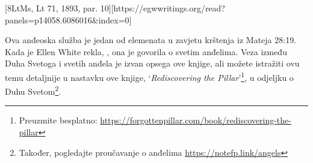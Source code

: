 [8LtMs, Lt 71, 1893, par. 10][https://egwwritings.org/read?panels=p14058.6086016&index=0]

Ova anđeoska služba je jedan od elemenata u zavjetu krštenja iz Mateja 28:19. Kada je Ellen White rekla, , ona je govorila o svetim anđelima. Veza između Duha Svetoga i svetih anđela je izvan opsega ove knjige, ali možete istražiti ovu temu detaljnije u nastavku ove knjige, ‘\textit{Rediscovering the Pillar}’\footnote{Preuzmite besplatno: \href{https://forgottenpillar.com/book/rediscovering-the-pillar}{https://forgottenpillar.com/book/rediscovering-the-pillar}}, u odjeljku o Duhu Svetom\footnote{Također, pogledajte proučavanje o anđelima \href{https://notefp.link/angels}{https://notefp.link/angels}}.





% 
